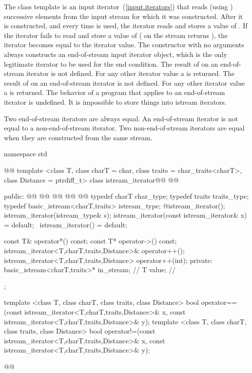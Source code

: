 \pnum
{}%
The class template
is an input iterator~(\ref{input.iterators}) that
reads (using
)
successive elements from the input stream for which it was constructed.
After it is constructed, and every time
\tcode{++}
is used, the iterator reads and stores a value of
.
If the iterator fails to read and store a value of 
(
on the stream returns
),
the iterator becomes equal to the
iterator value.
The constructor with no arguments
always constructs
an end-of-stream input iterator object, which is the only legitimate iterator to be used
for the end condition.
The result of
on an end-of-stream iterator is not defined.
For any other iterator value a
is returned.
The result of
on an end-of-stream iterator is not defined.
For any other iterator value a
is returned.
The behavior of a program that applies  to an end-of-stream
iterator is undefined.
It is impossible to store things into istream iterators.

\pnum
Two end-of-stream iterators are always equal.
An end-of-stream iterator is not
equal to a non-end-of-stream iterator.
Two non-end-of-stream iterators are equal when they are constructed from the same stream.

\begin{codeblock}
namespace std { @@
  template <class T, class charT = char, class traits = char_traits<charT>,
      class Distance = ptrdiff_t>
  class istream_iterator@\removed{:}@
    @@ {
  public:
    @@
    @@
    @@
    @@
    @@
    typedef charT char_type;
    typedef traits traits_type;
    typedef basic_istream<charT,traits> istream_type;
    @\seebelow@ istream_iterator();
    istream_iterator(istream_type& s);
    istream_iterator(const istream_iterator& x) = default;
   ~istream_iterator() = default;

    const T& operator*() const;
    const T* operator->() const;
    istream_iterator<T,charT,traits,Distance>& operator++();
    istream_iterator<T,charT,traits,Distance>  operator++(int);
  private:
    basic_istream<charT,traits>* in_stream; // \expos
    T value;                                // \expos
  };

  template <class T, class charT, class traits, class Distance>
    bool operator==(const istream_iterator<T,charT,traits,Distance>& x,
            const istream_iterator<T,charT,traits,Distance>& y);
  template <class T, class charT, class traits, class Distance>
    bool operator!=(const istream_iterator<T,charT,traits,Distance>& x,
            const istream_iterator<T,charT,traits,Distance>& y);
}@\newtxt{\}\}}@
\end{codeblock}

